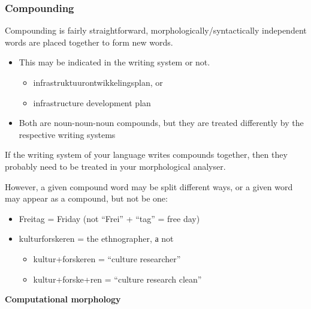 \documentclass[10pt,xetex]{beamer} %
\begin{document}
\begin{frame}
  \frametitle{Compounding}

Compounding is fairly straightforward, morphologically/syntactically independent words are placed together to form new words.

\begin{itemize}
  \item This may be indicated in the writing system or not.
  \begin{itemize}
    \item infrastruktuurontwikkelingsplan, or
    \item infrastructure development plan
  \end{itemize}
  \item Both are noun-noun-noun compounds, but they are treated differently by the respective writing systems
\end{itemize}

If the writing system of your language writes compounds together, then they probably need to be treated in your morphological analyser.

However, a given compound word may be split different ways, or a given word may appear as a compound, but not be one:

\begin{itemize}
  \item Freitag = Friday (not ``Frei'' + ``tag'' = free day)
  \item kulturforskeren = the ethnographer, а not
  \begin{itemize}

  \item kultur+forskeren = ``culture researcher''
  \item kultur+forske+ren = ``culture research clean''
  \end{itemize}
\end{itemize}

\end{frame}
%
%
%
%


\begin{frame} %
 \begin{center}
 {\Large {\bf Computational morphology}}
 \end{center}
\end{frame}
\end{document}
